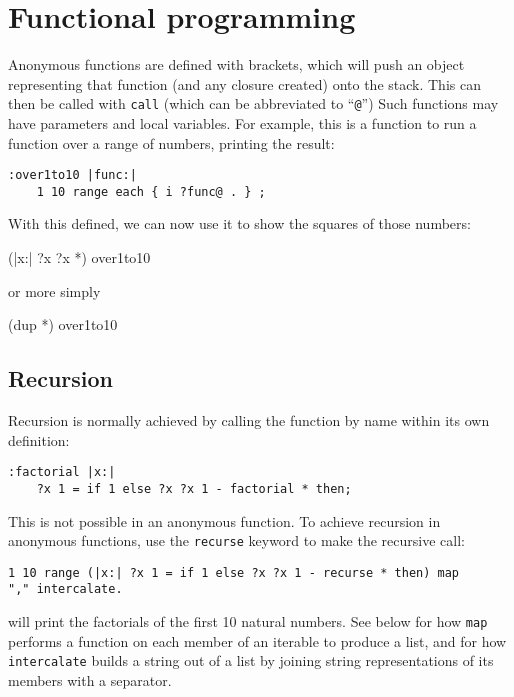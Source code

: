 \section{Functional programming}
\label{functional}
\indw{(}\indw{)}
Anonymous functions are defined with brackets, which will push an object
representing that function (and any closure created) onto the stack. This can
then be called with \texttt{call}  (which can be abbreviated to ``\texttt{@}'')
Such functions may have parameters and local variables.
For example, this is a function to run a function over a range of numbers,
printing the result:
\begin{lstlisting}
:over1to10 |func:|
    1 10 range each { i ?func@ . } ;
\end{lstlisting}
With this defined, we can now use it to show the squares of those
numbers:        
\begin{v}
    (|x:| ?x ?x *) over1to10
\end{v}
or more simply
\begin{v}
    (dup *) over1to10
\end{v}

\subsection{Recursion}
Recursion is normally achieved by calling the function by name within
its own definition:
\begin{lstlisting}
:factorial |x:|
    ?x 1 = if 1 else ?x ?x 1 - factorial * then;
\end{lstlisting}
This is not possible in an anonymous function. To achieve recursion
in anonymous functions, use the
\texttt{recurse} keyword to make the recursive call:
\begin{lstlisting}
1 10 range (|x:| ?x 1 = if 1 else ?x ?x 1 - recurse * then) map
"," intercalate.
\end{lstlisting}
will print the factorials of the first 10 natural numbers. See below
for how \texttt{map} performs a function on each member of an iterable
to produce a list, and for how \texttt{intercalate} builds a string
out of a list by joining string representations of its members with
a separator.
